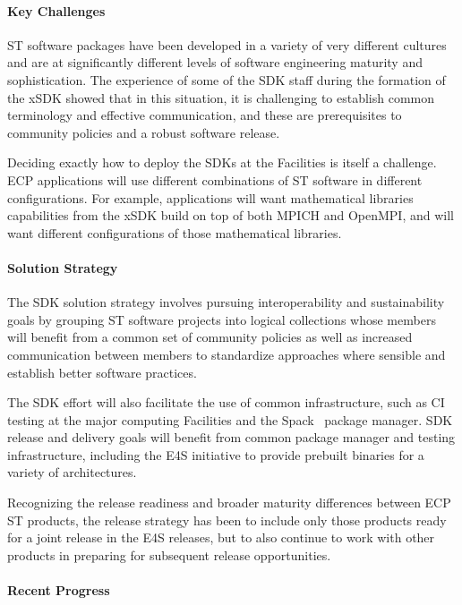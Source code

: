 \paragraph{Key Challenges}
ST software packages have been developed in a variety of very different cultures and are at significantly different levels of software engineering maturity and sophistication. The experience of some of the SDK staff during the formation of the xSDK showed that in this situation, it is challenging to establish common terminology and effective communication, and these are prerequisites to community policies and a robust software release.

Deciding exactly how to deploy the SDKs at the Facilities is itself a challenge. ECP applications will use different combinations of ST software in different configurations. For example, applications will want mathematical libraries capabilities from the xSDK build on top of both MPICH and OpenMPI, and will want different configurations of those mathematical libraries.

\paragraph{Solution Strategy}
The SDK solution strategy involves pursuing interoperability and sustainability goals by grouping ST software projects into logical collections whose members will benefit from a common set of community policies as well as increased communication between members to standardize approaches where sensible and establish better software practices. 

The SDK effort will also facilitate the use of common infrastructure, such as CI testing at the major computing Facilities and the Spack~\cite{gamblin+:sc15} package manager. SDK release and delivery goals will benefit from common package manager and testing infrastructure, including the E4S initiative to provide prebuilt binaries for a variety of architectures.

Recognizing the release readiness and broader maturity differences between ECP ST products, the release strategy has been to include only those products ready for a joint release in the E4S releases, but to also continue to work with other products in preparing for subsequent release opportunities.

\paragraph{Recent Progress}

